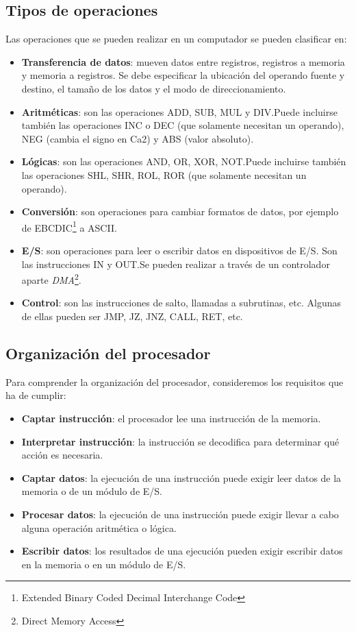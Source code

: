 \subsection{Tipos de operaciones}

Las operaciones que se pueden realizar en un computador se pueden clasificar en:

\begin{itemize}
  \item \textbf{Transferencia de datos}: mueven datos entre registros, registros a memoria y memoria a registros. Se debe especificar la ubicación del operando fuente y destino, el tamaño de los datos y el modo de direccionamiento.
  \item \textbf{Aritméticas}: son las operaciones ADD, SUB, MUL y DIV.\@ Puede incluirse también las operaciones INC o DEC (que solamente necesitan un operando), NEG (cambia el signo en Ca2) y ABS (valor absoluto).
  \item \textbf{Lógicas}: son las operaciones AND, OR, XOR, NOT.\@ Puede incluirse también las operaciones SHL, SHR, ROL, ROR (que solamente necesitan un operando).
  \item \textbf{Conversión}: son operaciones para cambiar formatos de datos, por ejemplo de EBCDIC\footnote{Extended Binary Coded Decimal Interchange Code} a ASCII.\@
  \item \textbf{E/S}: son operaciones para leer o escribir datos en dispositivos de E/S. Son las instrucciones IN y OUT.\@ Se pueden realizar a través de un controlador aparte \textit{DMA}\footnote{Direct Memory Access}.
  \item \textbf{Control}: son las instrucciones de salto, llamadas a subrutinas, etc. Algunas de ellas pueden ser JMP, JZ, JNZ, CALL, RET, etc.
\end{itemize}

\subsection{Organización del procesador}

Para comprender la organización del procesador, consideremos los requisitos que ha de cumplir:

\begin{itemize}
  \item \textbf{Captar instrucción}: el procesador lee una instrucción de la memoria.
  \item \textbf{Interpretar instrucción}: la instrucción se decodifica para determinar qué acción es necesaria.
  \item \textbf{Captar datos}: la ejecución de una instrucción puede exigir leer datos de la memoria o de un módulo de E/S.
  \item \textbf{Procesar datos}: la ejecución de una instrucción puede exigir llevar a cabo alguna operación aritmética o lógica.
  \item \textbf{Escribir datos}: los resultados de una ejecución pueden exigir escribir datos en la memoria o en un módulo de E/S.
\end{itemize}

